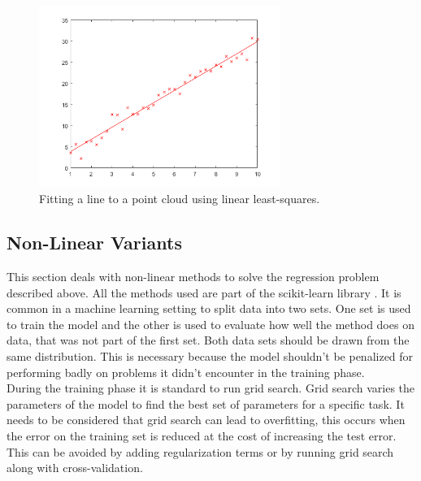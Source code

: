\begin{figure}[h]
\centering
\includegraphics[width=0.7\textwidth]{figures/linReg}
\caption{Fitting a line to a point cloud using linear least-squares.}
\label{fig:linReg}
\end{figure}

\subsection{Non-Linear Variants}
This section deals with non-linear methods to solve the regression problem described above. All the methods used are part of the scikit-learn library \cite{scikit-learn}. It is common in a machine learning setting to split data into two sets. One set is used to train the model and the other is used to evaluate how well the method does on data, that was not part of the first set. Both data sets should be drawn from the same distribution. This is necessary because the model shouldn't be penalized for performing badly on problems it didn't encounter in the training phase.\\
During the training phase it is standard to run grid search. Grid search varies the parameters of the model to find the best set of parameters for a specific task. It needs to be considered that grid search can lead to overfitting, this occurs when the error on the training set is reduced at the cost of increasing the test error. This can be avoided by adding regularization terms or by running grid search along with cross-validation.
